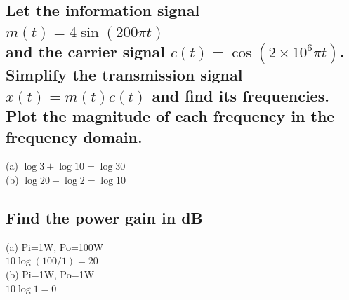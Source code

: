 \documentclass[12pt,a4paper]{article}
\begin{document}
\subsection{Let the information signal $m(t)=4\sin (200\pi t)$ \\
	and the carrier signal $c(t)=\cos(2\times 10^6\pi t)$.\\
Simplify the transmission signal $x(t)=m(t)c(t)$ and	find its frequencies. \\
 Plot the magnitude of each frequency in the	frequency domain.} 
(a) $\log 3 + \log 10 = \log 30$\\
(b) $\log 20 - \log 2 = \log 10 $

\subsection{Find the power gain in dB}
(a) Pi=1W, Po=100W\\ $10\log(100/1) = 20 $\\
(b) Pi=1W, Po=1W\\ $10\log 1 = 0$
\end{document}
